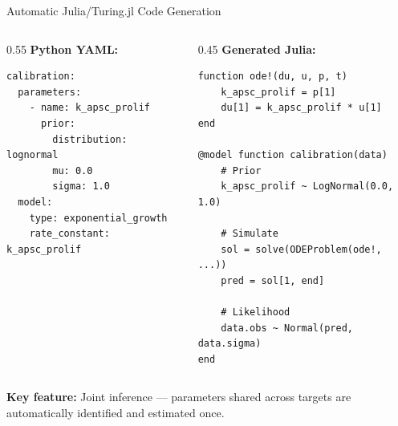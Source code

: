 \documentclass[aspectratio=169,10pt]{beamer}
\begin{document}
\begin{frame}[fragile]{Automatic Julia/Turing.jl Code Generation}
\begin{columns}
\begin{column}{0.55\textwidth}
\textbf{Python YAML:}
\begin{lstlisting}[style=yaml, basicstyle=\ttfamily\tiny]
calibration:
  parameters:
    - name: k_apsc_prolif
      prior:
        distribution: lognormal
        mu: 0.0
        sigma: 1.0
  model:
    type: exponential_growth
    rate_constant: k_apsc_prolif
\end{lstlisting}
\end{column}
\begin{column}{0.45\textwidth}
\textbf{Generated Julia:}
\begin{lstlisting}[style=julia, basicstyle=\ttfamily\tiny]
function ode!(du, u, p, t)
    k_apsc_prolif = p[1]
    du[1] = k_apsc_prolif * u[1]
end

@model function calibration(data)
    # Prior
    k_apsc_prolif ~ LogNormal(0.0, 1.0)

    # Simulate
    sol = solve(ODEProblem(ode!, ...))
    pred = sol[1, end]

    # Likelihood
    data.obs ~ Normal(pred, data.sigma)
end
\end{lstlisting}
\end{column}
\end{columns}

\vspace{0.5em}
\textbf{Key feature:} \textcolor{juliagreen}{Joint inference} --- parameters shared across targets are automatically identified and estimated once.
\end{frame}
\end{document}

